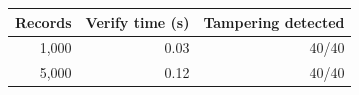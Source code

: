 \begin{tabular}{rrr}
\toprule
Records & Verify time (s) & Tampering detected\\
\midrule
1,000 & 0.03 & 40/40\\
5,000 & 0.12 & 40/40\\
\bottomrule
\end{tabular}
